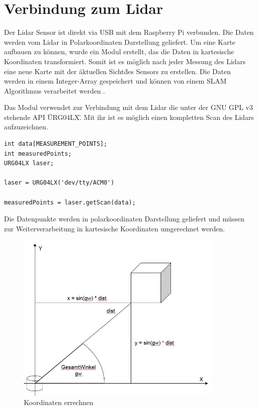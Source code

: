 \section{Verbindung zum Lidar}

Der Lidar Sensor ist direkt via USB mit dem Raspberry Pi verbunden. Die Daten werden vom Lidar in Polarkoordinaten Darstellung geliefert. Um eine Karte aufbauen zu können, wurde ein Modul erstellt, das die Daten in kartesische Koordinaten transformiert. Somit ist es möglich nach jeder Messung des Lidars eine neue Karte mit der \"aktuellen Sicht\" des Sensors zu erstellen. Die Daten werden in einem Integer-Array gespeichert und können von einem SLAM Algorithmus verarbeitet werden . 

Das Modul verwendet zur Verbindung mit dem Lidar die unter der GNU GPL v3 stehende API \"URG04LX\". Mit ihr ist es möglich einen kompletten Scan des Lidars aufzuzeichnen. 

\begin{lstlisting}
int data[MEASUREMENT_POINTS]; 
int measuredPoints;
URG04LX laser;

laser = URG04LX('dev/tty/ACM0')

measuredPoints = laser.getScan(data);

\end{lstlisting}

Die Datenpunkte werden in polarkoordinaten Darstellung geliefert und müssen zur Weiterverarbeitung in kartesische Koordinaten umgerechnet werden. 

\begin{figure}[h]
\begin{center}
\includegraphics[width=10cm]{images/chapter5/LidarKoordRechnung.jpg}
\caption{Koordinaten errechnen}
\label{Koordinaten_errechnen}
\end{center}
\end{figure}


